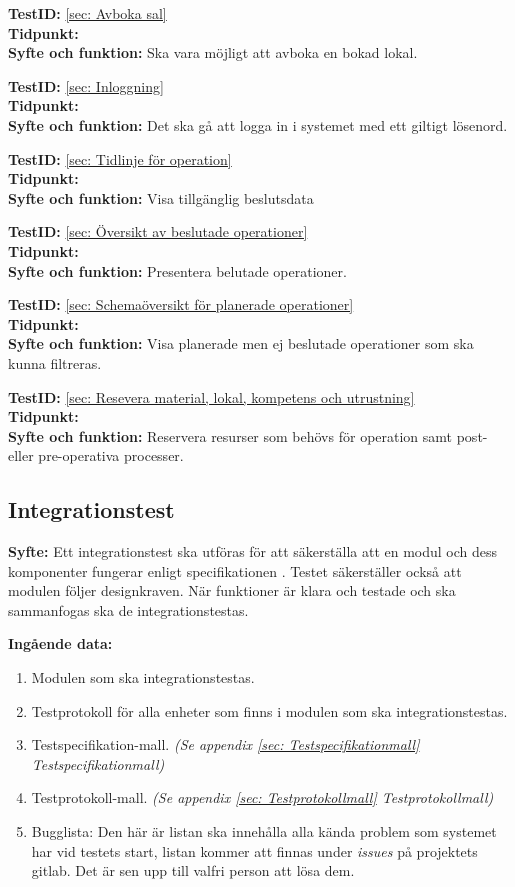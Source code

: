 \documentclass[a4paper,10pt, twoside]{article}
\begin{document}
\textbf{TestID:} \ref{sec: Avboka sal} 
\\ \textbf{Tidpunkt:}
\\ \textbf{Syfte och funktion:} Ska vara möjligt att avboka en bokad lokal.
  
\textbf{TestID:} \ref{sec: Inloggning} 
\\ \textbf{Tidpunkt:}  
\\ \textbf{Syfte och funktion:} Det ska gå att logga in i systemet med ett giltigt lösenord.
  
\textbf{TestID:} \ref{sec: Tidlinje för operation} 
\\ \textbf{Tidpunkt:}
\\ \textbf{Syfte och funktion:} Visa tillgänglig beslutsdata

\textbf{TestID:} \ref{sec: Översikt av beslutade operationer} 
\\ \textbf{Tidpunkt:}  
\\ \textbf{Syfte och funktion:} Presentera belutade operationer.

\textbf{TestID:} \ref{sec: Schemaöversikt för planerade operationer} 
\\ \textbf{Tidpunkt:}  
\\ \textbf{Syfte och funktion:} Visa planerade men ej beslutade operationer som ska kunna filtreras.
  
\textbf{TestID:} \ref{sec: Resevera material, lokal, kompetens och utrustning} 
\\ \textbf{Tidpunkt:}
\\ \textbf{Syfte och funktion:} Reservera resurser som behövs för operation samt post- eller pre-operativa processer.

\subsection{Integrationstest}
\label{sec:Integrationstest}
\textbf{Syfte:} Ett integrationstest ska utföras för att säkerställa att en modul och dess komponenter fungerar enligt specifikationen \cite{kravspec}. Testet säkerställer också att modulen följer designkraven. När funktioner är klara och testade och ska sammanfogas ska de integrationstestas.

\textbf{Ingående data:}
\begin{enumerate}
	\item Modulen som ska integrationstestas.
    \item Testprotokoll för alla enheter som finns i modulen som ska integrationstestas.
    \item Testspecifikation-mall. \emph{(Se appendix \ref{sec: Testspecifikationmall} {Testspecifikationmall})}
    \item Testprotokoll-mall. \emph{(Se appendix \ref{sec: Testprotokollmall} Testprotokollmall)}
    \item Bugglista: Den här är listan ska innehålla alla kända problem som systemet har vid testets start, listan kommer 			  att finnas under \emph{issues} på projektets gitlab. Det är sen upp till valfri person att lösa dem.
\end{enumerate}
\end{document}

